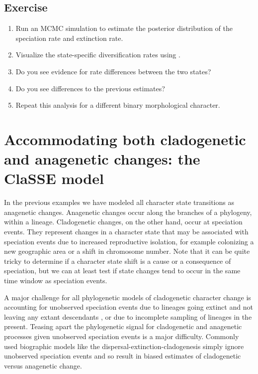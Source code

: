 


\subsection{Exercise}

\begin{enumerate}
\item Run an MCMC simulation to estimate the posterior distribution of the speciation rate and extinction rate.
\item Visualize the state-specific diversification rates using \R.
\item Do you see evidence for rate differences between the two states?
\item Do you see differences to the previous \BiSSE estimates?
\item Repeat this analysis for a different binary morphological character.
\end{enumerate}


\newpage
\section{Accommodating both cladogenetic and anagenetic changes: the ClaSSE model}\label{sec:ClaSSE}

In the previous examples we have modeled all character state transitions
as anagenetic changes.
Anagenetic changes occur along the branches of a phylogeny, within a lineage.
Cladogenetic changes, on the other hand, occur at speciation events.
They represent changes in a character state that may be associated with speciation events
due to increased reproductive isolation,
for example colonizing a new geographic area or a shift in chromosome number.
Note that it can be quite tricky to determine if a character state shift is a cause or a consequence of speciation, but we can at least test if state changes tend to occur in the same time window as speciation events.

A major challenge for all phylogenetic models of cladogenetic character change
is accounting
for unobserved speciation events due to lineages going extinct
and not leaving any extant descendants \citep{Bokma2002},
or due to incomplete sampling of lineages in the present.
Teasing apart
the phylogenetic signal for cladogenetic and anagenetic processes given
unobserved speciation events is a major difficulty.
Commonly used biographic models like the
dispersal-extinction-cladogenesis \citep[DEC;][]{Ree2008} simply ignore
unobserved speciation events and so result in biased
estimates of cladogenetic versus anagenetic change.

